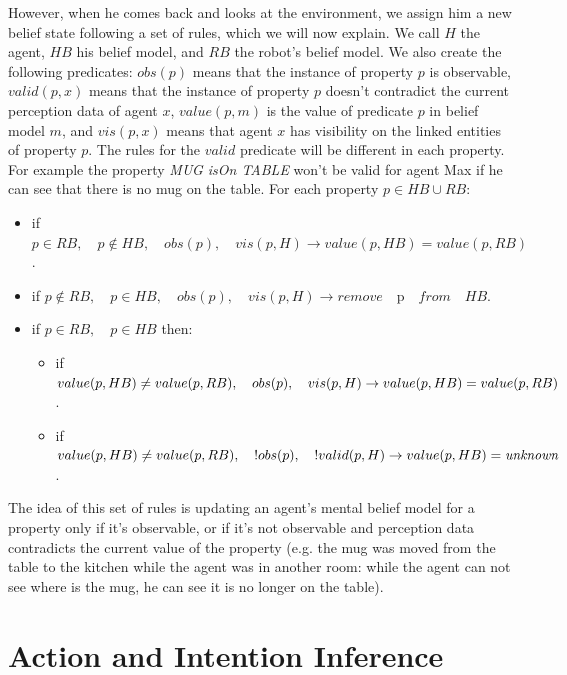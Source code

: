 However, when he comes back and looks at the environment, we assign him a new belief state following a set of rules, which we will now explain. We call $H$ the agent, $HB$ his belief model, and $RB$ the robot's belief model. We also create the following predicates: $obs(p)$ means that the instance of property $p$ is observable, $valid(p,x)$ means that the instance of property $p$ doesn't contradict the current perception data of agent $x$, $value(p,m)$ is the value of predicate $p$ in belief model $m$, and $vis(p,x)$ means that agent $x$ has visibility on the linked entities of property $p$. The rules for the $valid$ predicate will be different in each property. For example the property \textit{MUG isOn TABLE} won't be valid for agent Max if he can see that there is no mug on the table. For each property $p\in HB \cup RB$:
\begin{itemize}
\item if $p \in RB, \quad p\not\in HB,\quad obs(p),\quad vis(p,H) \rightarrow value(p,HB)=value(p,RB)$.
\item if $p \not \in RB,\quad p\in HB,\quad obs(p),\quad vis(p,H) \rightarrow remove\quad $p$ \quad from \quad HB$.
\item if $p\in RB,\quad p\in HB$ then:
	\begin{itemize}
      \item if $value(p,HB)\neq value(p,RB),\\ \quad obs(p),\quad vis(p,H) \rightarrow \\ value(p,HB)=value(p,RB)$.
      \item if $value(p,HB)\neq value(p,RB),\\ \quad !obs(p),\quad !valid(p,H) \rightarrow \\ value(p,HB)=\textit{unknown}$.
	\end{itemize}
\end{itemize}
The idea of this set of rules is updating an agent's mental belief model for a property only if it's observable, or if it's not observable and perception data contradicts the current value of the property (e.g. the mug was moved from the table to the kitchen while the agent was in another room: while the agent can not see where is the mug, he can see it is no longer on the table).



\section{Action and Intention Inference}
\label{sec:situation_assessment-intention_recognition}

